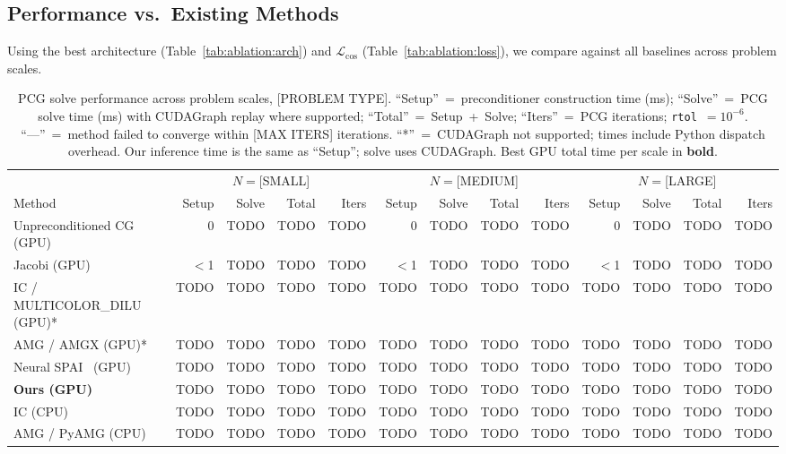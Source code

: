\documentclass[acmtog,anonymous,review]{acmart}
\begin{document}
\subsection{Performance vs.\ Existing Methods}
\label{sec:results:perf}

Using the best architecture (Table~\ref{tab:ablation:arch}) and $\mathcal{L}_{\mathrm{cos}}$
(Table~\ref{tab:ablation:loss}), we compare against all baselines across problem scales.

\begin{table}[h]
\centering
\caption{PCG solve performance across problem scales, [PROBLEM TYPE].
``Setup''~=~preconditioner construction time (ms); ``Solve''~=~PCG solve time (ms) with
CUDAGraph replay where supported; ``Total''~=~Setup~+~Solve;
``Iters''~=~PCG iterations; \texttt{rtol}~$= 10^{-6}$.
``---''~=~method failed to converge within [MAX ITERS] iterations.
``*''~=~CUDAGraph not supported; times include Python dispatch overhead.
Our inference time is the same as ``Setup''; solve uses CUDAGraph.
Best GPU total time per scale in \textbf{bold}.}
\label{tab:main:perf}
\begin{tabular}{l rrr r | rrr r | rrr r}
\hline
& \multicolumn{4}{c|}{$N = $[SMALL]} & \multicolumn{4}{c|}{$N = $[MEDIUM]} & \multicolumn{4}{c}{$N = $[LARGE]} \\
Method & Setup & Solve & Total & Iters & Setup & Solve & Total & Iters & Setup & Solve & Total & Iters \\
\hline
Unpreconditioned CG (GPU)  & 0 & TODO & TODO & TODO & 0 & TODO & TODO & TODO & 0 & TODO & TODO & TODO \\
Jacobi (GPU)               & $<$1 & TODO & TODO & TODO & $<$1 & TODO & TODO & TODO & $<$1 & TODO & TODO & TODO \\
IC / MULTICOLOR\_DILU (GPU)* & TODO & TODO & TODO & TODO & TODO & TODO & TODO & TODO & TODO & TODO & TODO & TODO \\
AMG / AMGX (GPU)*          & TODO & TODO & TODO & TODO & TODO & TODO & TODO & TODO & TODO & TODO & TODO & TODO \\
Neural SPAI~\cite{yang2025sparse} (GPU) & TODO & TODO & TODO & TODO & TODO & TODO & TODO & TODO & TODO & TODO & TODO & TODO \\
\textbf{Ours (GPU)}        & TODO & TODO & TODO & TODO & TODO & TODO & TODO & TODO & TODO & TODO & TODO & TODO \\
\hline
IC (CPU)                   & TODO & TODO & TODO & TODO & TODO & TODO & TODO & TODO & TODO & TODO & TODO & TODO \\
AMG / PyAMG (CPU)          & TODO & TODO & TODO & TODO & TODO & TODO & TODO & TODO & TODO & TODO & TODO & TODO \\
\hline
\end{tabular}
\end{table}
\end{document}

